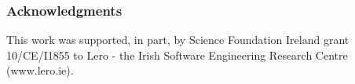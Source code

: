 \documentclass[runningheads,a4paper]{llncs}
\begin{document}

\subsubsection*{Acknowledgments}
This work was supported, in part, by Science Foundation Ireland grant 10/CE/I1855 to Lero - the Irish Software Engineering Research Centre (www.lero.ie).




\end{document}
